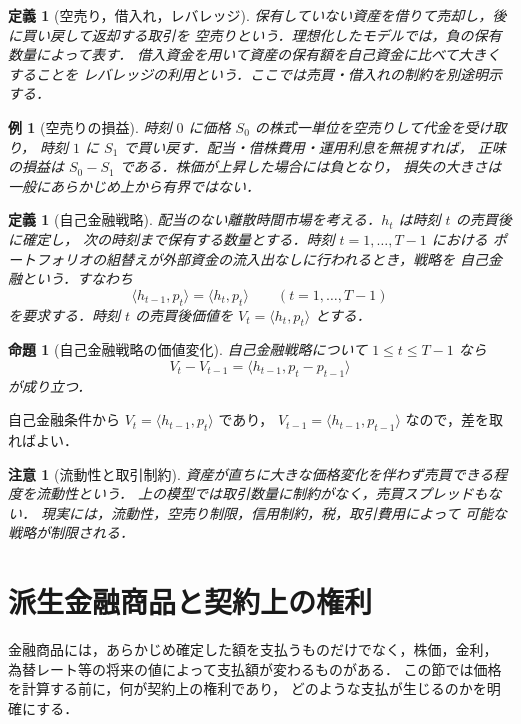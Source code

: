 \documentclass[a5paper,10pt,onecolumn]{jsarticle}
\makeatletter
\theoremstyle{mathnotetheorem}
\newtheorem{definition}[theorem]{定義}
\newtheorem{proposition}[theorem]{命題}
\newtheorem{example}[theorem]{例}
\newtheorem{remark}[theorem]{注意}
\renewcommand{\proofname}{証明}
\renewenvironment{proof}[1][\proofname]{%
  \par\pushQED{\qed}\normalfont\topsep4\p@\@plus2\p@\relax
  \trivlist\item[\hskip\labelsep\bfseries #1]\ignorespaces
}{\popQED\endtrivlist\@endpefalse}
\makeatother
\begin{document}
\begin{definition}[空売り，借入れ，レバレッジ]
保有していない資産を借りて売却し，後に買い戻して返却する取引を
\emph{空売り}という．理想化したモデルでは，負の保有数量によって表す．
借入資金を用いて資産の保有額を自己資金に比べて大きくすることを
\emph{レバレッジ}の利用という．ここでは売買・借入れの制約を別途明示する．
\end{definition}

\begin{example}[空売りの損益]
時刻 $0$ に価格 $S_0$ の株式一単位を空売りして代金を受け取り，
時刻 $1$ に $S_1$ で買い戻す．配当・借株費用・運用利息を無視すれば，
正味の損益は $S_0-S_1$ である．株価が上昇した場合には負となり，
損失の大きさは一般にあらかじめ上から有界ではない．
\end{example}

\begin{definition}[自己金融戦略]
配当のない離散時間市場を考える．$h_t$ は時刻 $t$ の売買後に確定し，
次の時刻まで保有する数量とする．時刻 $t=1,\ldots,T-1$ における
ポートフォリオの組替えが外部資金の流入出なしに行われるとき，戦略を
\emph{自己金融}という．すなわち
\[
 \langle h_{t-1},p_t\rangle=\langle h_t,p_t\rangle
 \qquad(t=1,\ldots,T-1)
\]
を要求する．時刻 $t$ の売買後価値を $V_t=\langle h_t,p_t\rangle$ とする．
\end{definition}

\begin{proposition}[自己金融戦略の価値変化]\label{prop:sf}
自己金融戦略について $1\le t\le T-1$ なら
\[
 V_t-V_{t-1}=\langle h_{t-1},p_t-p_{t-1}\rangle
\]
が成り立つ．
\end{proposition}
\begin{proof}
自己金融条件から
$V_t=\langle h_{t-1},p_t\rangle$ であり，
$V_{t-1}=\langle h_{t-1},p_{t-1}\rangle$ なので，差を取ればよい．\end{proof}

\begin{remark}[流動性と取引制約]
資産が直ちに大きな価格変化を伴わず売買できる程度を\emph{流動性}という．
上の模型では取引数量に制約がなく，売買スプレッドもない．
現実には，流動性，空売り制限，信用制約，税，取引費用によって
可能な戦略が制限される．
\end{remark}

\section{派生金融商品と契約上の権利}

金融商品には，あらかじめ確定した額を支払うものだけでなく，株価，金利，
為替レート等の将来の値によって支払額が変わるものがある．
この節では価格を計算する前に，何が契約上の権利であり，
どのような支払が生じるのかを明確にする．
\end{document}
